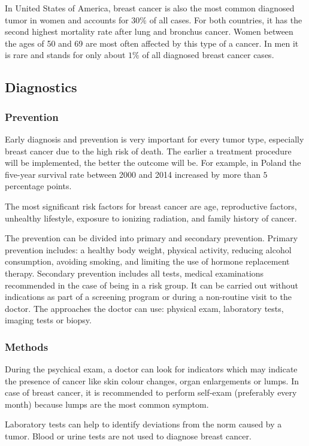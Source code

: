 \documentclass[12pt]{article}
\begin{document}
In United States of America, breast cancer is also the most common diagnosed tumor in women and accounts for $30\%$ of all cases\cite{4}.
For both countries, it has the second highest mortality rate after lung and bronchus cancer. Women between the ages of 50 and 69 are most often affected by this type of a cancer. In men it is rare and stands for only about $1\%$ of all diagnosed breast cancer cases\cite{3}.


\subsection{Diagnostics}
\subsubsection{Prevention\cite{3}}
Early diagnosis and prevention is very important for every tumor type, especially breast cancer due to the high risk of death. The earlier a treatment procedure will be implemented, the better the outcome will be. For example, in Poland the five-year survival rate between 2000 and 2014 increased by more than $5$ percentage points.

The most significant risk factors for breast cancer are age, reproductive factors, unhealthy lifestyle, exposure to ionizing radiation, and family history of cancer.

The prevention can be divided into primary and secondary prevention. Primary prevention includes: a healthy body weight, physical activity, reducing alcohol consumption, avoiding smoking, and limiting the use of hormone replacement therapy. Secondary prevention includes all tests, medical examinations recommended in the case of being in a risk group. It can be carried out without indications as part of a screening program or during a non-routine visit to the doctor. The approaches the doctor can use: physical exam, laboratory tests, imaging tests or biopsy.


\subsubsection{Methods}
During the psychical exam, a doctor can look for indicators which may indicate the presence of cancer like skin colour changes, organ enlargements or lumps. In case of breast cancer, it is recommended to perform self-exam (preferably every month) because lumps are the most common symptom\cite{3}.

Laboratory tests can help to identify deviations from the norm caused by a tumor. Blood or urine tests are not used to diagnose breast cancer.
\end{document}
